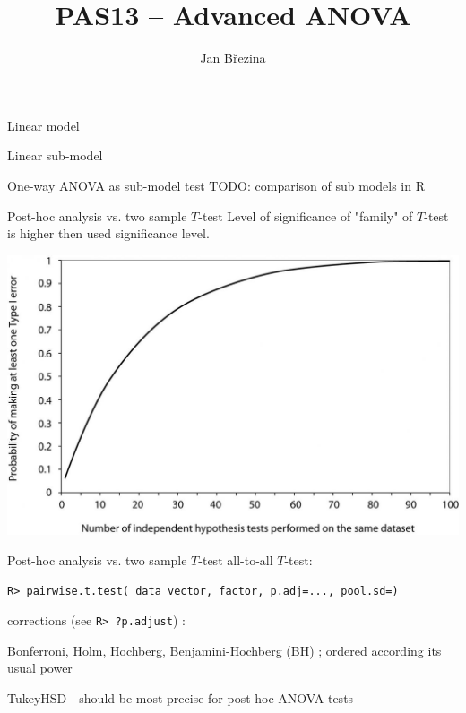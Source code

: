 \documentclass[smaller]{beamer}
\title{PAS13 -- Advanced ANOVA}
\author{Jan B\v rezina}
\institute %
{
  Technical University of Liberec
}
\def\xskip{{\vspace{2ex}}}
\begin{document}
\begin{frame}
  \titlepage
\end{frame}

\begin{frame}{Linear model}
\end{frame}

\begin{frame}{Linear sub-model}
\end{frame}

\begin{frame}{One-way ANOVA as sub-model test}
TODO: comparison of sub models in R
\end{frame}

\begin{frame}{Post-hoc analysis vs. two sample $T$-test}
Level of significance of "family" of $T$-test is higher then used significance level.
\begin{center}
 \includegraphics[scale=0.25]{./12_type_I_error_vs_groups.jpg}
\end{center}
\end{frame}

\begin{frame}[fragile]{Post-hoc analysis vs. two sample $T$-test}
all-to-all $T$-test:

\verb'R> pairwise.t.test( data_vector, factor, p.adj=..., pool.sd=)'

\xskip
corrections (see \verb'R> ?p.adjust') :

Bonferroni, Holm, Hochberg, Benjamini-Hochberg (BH) ; ordered according its usual power

TukeyHSD - should be most precise for post-hoc ANOVA tests
\end{frame}
\end{document}
